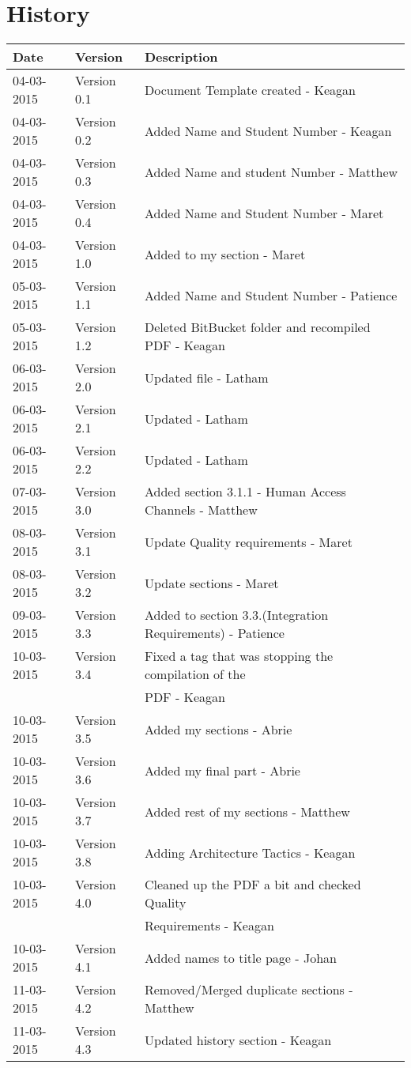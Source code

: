 \documentclass[hidelinks, 12pt]{article}
\begin{document}


\section{History}
\begin{tabular}{|l|l|l|}
\hline
Date & Version & Description\\
\hline
04-03-2015 & Version 0.1 & Document Template created - Keagan\\
\hline
04-03-2015 & Version 0.2 & Added Name and Student Number - Keagan\\
\hline
04-03-2015 & Version 0.3 & Added Name and student Number - Matthew\\
\hline
04-03-2015 & Version 0.4 & Added Name and Student Number - Maret\\
\hline
04-03-2015 & Version 1.0 & Added to my section - Maret\\
\hline
05-03-2015 & Version 1.1 & Added Name and Student Number - Patience\\
\hline
05-03-2015 & Version 1.2 & Deleted BitBucket folder and recompiled PDF - Keagan\\
\hline
06-03-2015 & Version 2.0 & Updated file - Latham\\
\hline
06-03-2015 & Version 2.1 & Updated - Latham\\
\hline
06-03-2015 & Version 2.2 & Updated - Latham\\
\hline
07-03-2015 & Version 3.0 & Added section 3.1.1 - Human Access Channels - Matthew\\
\hline
08-03-2015 & Version 3.1 & Update Quality requirements - Maret\\
\hline
08-03-2015 & Version 3.2 & Update sections - Maret\\
\hline
09-03-2015 & Version 3.3 & Added to section 3.3.(Integration Requirements) - Patience\\
\hline
10-03-2015 & Version 3.4 & Fixed a tag that was stopping the compilation of the \\&&PDF - Keagan\\
\hline
10-03-2015 & Version 3.5 & Added my sections - Abrie\\
\hline
10-03-2015 & Version 3.6 & Added my final part - Abrie\\
\hline
10-03-2015 & Version 3.7 & Added rest of my sections - Matthew\\
\hline
10-03-2015 & Version 3.8 & Adding Architecture Tactics - Keagan\\
\hline
10-03-2015 & Version 4.0 & Cleaned up the PDF a bit and checked Quality \\&&Requirements - Keagan\\
\hline
10-03-2015 & Version 4.1 & Added names to title page - Johan\\
\hline
11-03-2015 & Version 4.2 & Removed/Merged duplicate sections - Matthew\\
\hline
11-03-2015 & Version 4.3 & Updated history section - Keagan\\
\hline



\end{tabular}
\end{document}
